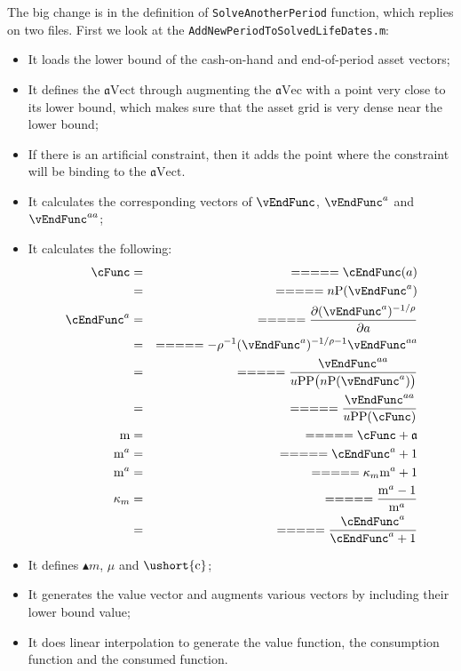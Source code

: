 \documentclass[titlepage,abstract]{\econtex}
\providecommand{\mFunc}{\ensuremath{\mathrm{m}}}
\providecommand{\aEndFunc}{\ensuremath{\mathfrak{a}}}
\begin{document}
The big change is in the definition of \texttt{SolveAnotherPeriod} function, which replies on two files. First we look at the \texttt{AddNewPeriodToSolvedLifeDates.m}:
      \begin{itemize}
        \item It loads the lower bound of the cash-on-hand and end-of-period asset vectors;
        \item It defines the $\ensuremath{\mathfrak{a}}\text{Vect}$ through augmenting the $\ensuremath{\mathfrak{a}}\text{Vec}$ with a point very close to its lower bound, which makes sure that the asset grid is very dense near the lower bound;
        \item If there is an artificial constraint, then it adds the point where the constraint will be binding to the $\ensuremath{\mathfrak{a}}\text{Vect}$.
        \item It calculates the corresponding vectors of $\vEndFunc$, $\vEndFunc^{a}$ and $\vEndFunc^{aa}$;
        \item It calculates the following:
        \begin{equation}\begin{gathered}\begin{aligned}
        \cFunc      &=& =  =  =  =  =  \cEndFunc(a) \\
             &=& =  =  =  =  =  n\text{P}(\vEndFunc^{a}) \\
        \cEndFunc^{a}      &=& =  =  =  =  = \frac{\partial (\vEndFunc^{a})^{-1/\rho}}{\partial a} \\
             &=& =  =  =  =  =  -\rho^{-1} (\vEndFunc^{a})^{-1/\rho-1} \vEndFunc^{aa} \\
             &=& =  =  =  =  =  \frac{\vEndFunc^{aa} }{u\text{PP}\big(
        n\text{P}(\vEndFunc^{a})\big)} \\
             &=& =  =  =  =  =  \frac{\vEndFunc^{aa} }{u\text{PP}(\cFunc)} \\
        \mFunc      &=& =  =  =  =  =  \cFunc + \aEndFunc \\
        \mFunc^{a}      &=& =  =  =  =  =  \cEndFunc^{a} + 1 \\
        \mFunc^{a}      &=& =  =  =  =  =  \kappa_{m}\mFunc^{a} + 1 \\
        \kappa_{m}      &=& =  =  =  =  =  \frac{\mFunc^{a}-1}{\mFunc^{a}} \\
             &=& =  =  =  =  =  \frac{\cEndFunc^{a}}{\cEndFunc^{a}+1}
        \end{aligned}\end{gathered}\end{equation}
        \item It defines $\ensuremath{\blacktriangle {m}}$, $\mu$ and $\ensuremath{\ushort{\mathrm{c}}}$;
        \item It generates the value vector and augments various vectors by including their lower bound value;
        \item It does linear interpolation to generate the value function, the consumption function and the consumed function.
        \end{itemize}
\end{document}
